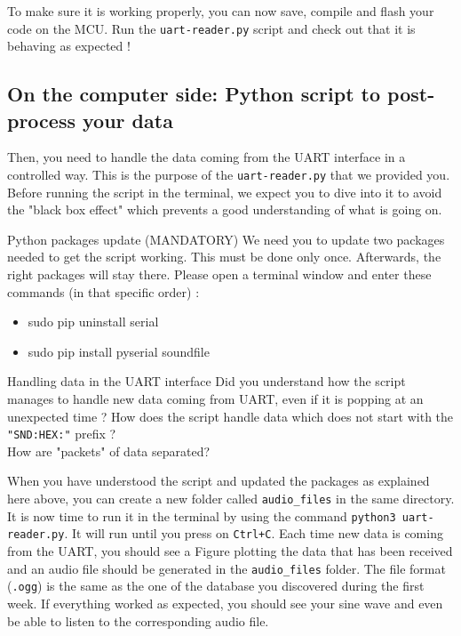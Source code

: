 \noindent To make sure it is working properly, you can now save, compile and flash your code on the MCU. Run the \texttt{uart-reader.py} script and check out that it is behaving as expected !

\subsection*{On the computer side: Python script to post-process your data}

Then, you need to handle the data coming from the UART interface in a controlled way. This is the purpose of the \texttt{uart-reader.py} that we provided you. Before running the script in the terminal, we expect you to dive into it to avoid the "black box effect" which prevents a good understanding of what is going on.

\begin{bclogo}[couleur = gray!20, arrondi = 0.2, logo=\bcattention]{Python packages update (MANDATORY)}
We need you to update two packages needed to get the script working. This must be done only once. Afterwards, the right packages will stay there. Please open a terminal window and enter these commands (in that specific order) :

\begin{itemize}
    \item sudo pip uninstall serial
    \item sudo pip install pyserial soundfile
\end{itemize}

\end{bclogo}

\begin{bclogo}[couleur = gray!20, arrondi = 0.2, logo=\bcquestion]{Handling data in the UART interface}
Did you understand how the script manages to handle new data coming from UART, even if it is popping at an unexpected time ? How does the script handle data which does not start with the \texttt{"SND:HEX:"} prefix ? \\

\noindent How are "packets" of data separated?
\end{bclogo}

\noindent When you have understood the script and updated the packages as explained here above, you can create a new folder called \texttt{audio\_files} in the same directory. It is now time to run it in the terminal by using the command \texttt{python3 uart-reader.py}. It will run until you press on \texttt{Ctrl+C}. Each time new data is coming from the UART, you should see a Figure plotting the data that has been received and an audio file should be generated in the \texttt{audio\_files} folder. The file format (\texttt{.ogg}) is the same as the one of the database you discovered during the first week. If everything worked as expected, you should see your sine wave and even be able to listen to the corresponding audio file.

